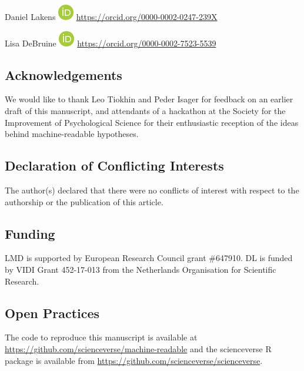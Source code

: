 \documentclass[
  english,
  doc,floatsintext]{apa6}
\begin{document}
Daniel Lakens \includegraphics{images/orcid.png} \url{https://orcid.org/0000-0002-0247-239X}

Lisa DeBruine \includegraphics{images/orcid.png} \url{https://orcid.org/0000-0002-7523-5539}

\hypertarget{acknowledgements}{%
\subsection{Acknowledgements}\label{acknowledgements}}

We would like to thank Leo Tiokhin and Peder Isager for feedback on an earlier draft of this manuscript, and attendants of a hackathon at the Society for the Improvement of Psychological Science for their enthusiastic reception of the ideas behind machine-readable hypotheses.

\hypertarget{declaration-of-conflicting-interests}{%
\subsection{Declaration of Conflicting Interests}\label{declaration-of-conflicting-interests}}

The author(s) declared that there were no conflicts of interest with respect to the authorship or the publication of this article.

\hypertarget{funding}{%
\subsection{Funding}\label{funding}}

LMD is supported by European Research Council grant \#647910. DL is funded by VIDI Grant 452-17-013 from the Netherlands Organisation for Scientific Research.

\hypertarget{open-practices}{%
\subsection{Open Practices}\label{open-practices}}

The code to reproduce this manuscript is available at \url{https://github.com/scienceverse/machine-readable} and the scienceverse R package is available from \url{https://github.com/scienceverse/scienceverse}.
\end{document}
